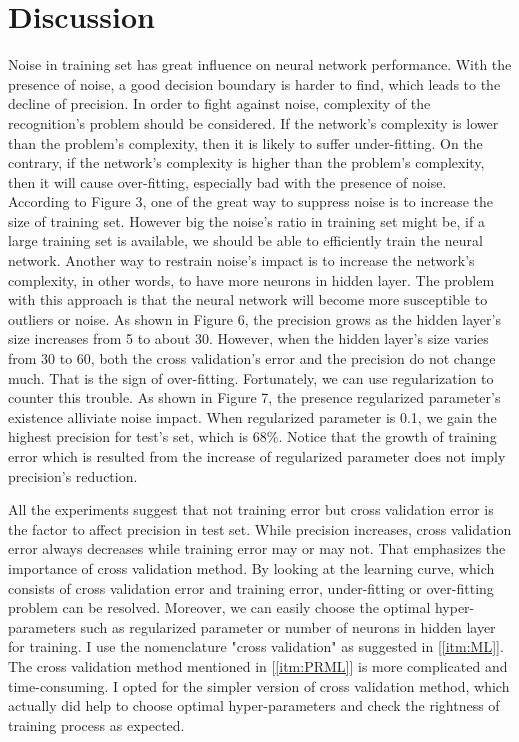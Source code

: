 \documentclass[a4paper, 11pt]{article}
\begin{document}
\section{Discussion}
Noise in training set has great influence on neural network performance. With the presence of noise, a good decision boundary is harder to find, which leads to the decline of precision. In order to fight against noise, complexity of the recognition's problem should be considered. If the network's complexity is lower than the problem's complexity, then it is likely to suffer under-fitting. On the contrary, if the network's complexity is higher than the problem's complexity, then it will cause over-fitting, especially bad with the presence of noise. According to Figure 3, one of the great way to suppress noise is to increase the size of training set. However big the noise's ratio in training set might be, if a large training set is available, we should be able to efficiently train the neural network. Another way to restrain noise's impact is to increase the network's complexity, in other words, to have more neurons in hidden layer. The problem with this approach is that the neural network will become more susceptible to outliers or noise. As shown in Figure 6, the precision grows as the hidden layer's size increases from 5 to about 30. However, when the hidden layer's size varies from 30 to 60, both the cross validation's error and the precision do not change much. That is the sign of over-fitting. Fortunately, we can use regularization to counter this trouble. As shown in Figure 7, the presence regularized parameter's existence alliviate noise impact. When regularized parameter is 0.1, we gain the highest precision for test's set, which is 68\%. Notice that the growth of training 
error which is resulted from the increase of regularized parameter does not imply precision's reduction.

All the experiments suggest that not training error but cross validation error is the factor to affect precision in test set. While precision increases, cross validation error always decreases while training error may or may not. That emphasizes the importance of cross validation method. By looking at the learning curve, which consists of cross validation error and training error, under-fitting or over-fitting problem can be resolved. Moreover, we can easily choose the optimal hyper-parameters such as regularized parameter or number of neurons in hidden layer for training. I use the nomenclature "cross validation" as suggested in [\ref{itm:ML}]. The cross validation method mentioned in [\ref{itm:PRML}] is more complicated and time-consuming. I opted for the simpler version of cross validation method, which actually did help to choose optimal hyper-parameters and check the rightness of training process as expected.
\end{document}
